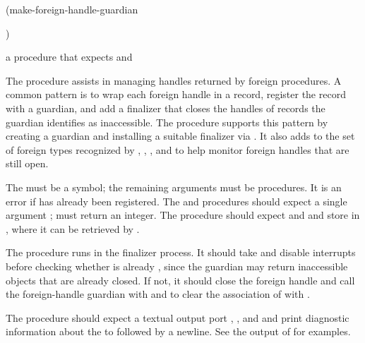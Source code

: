 \begin{procedure}
\codebegin
(make-foreign-handle-guardian   \strut
                                )\strut
\codeend
\end{procedure}
\returns{} a procedure that expects  and 

The  procedure assists in managing handles
returned by foreign procedures.
A common pattern is to wrap each foreign handle in a record, register the
record with a guardian, and add a finalizer that closes the handles of records
the guardian identifies as inaccessible.
The  procedure supports this pattern
by creating a guardian and installing a suitable finalizer via .
It also adds  to the set of foreign types recognized by
,
,
, and
to help monitor foreign handles that are still open.

The  must be a symbol; the remaining arguments must be
procedures.  It is an error if  has already been registered.
The  and  procedures should expect a
single argument ;  must return an integer.
The  procedure should expect  and  and
store  in , where it can be retrieved by .

The  procedure runs in the finalizer process.
It should take  and disable interrupts before checking whether
 is already ,
since the guardian may return inaccessible objects that are already closed.
If not, it should close the foreign handle and call the foreign-handle guardian
with  and  to clear the association of  with .

The  procedure should expect a textual output port ,
, and  and print diagnostic information about the
 to  followed by a newline.
See the output of  for examples.


